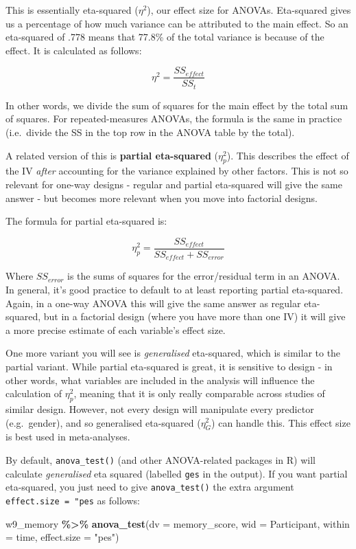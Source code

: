 \documentclass[
]{book}
\newenvironment{Shaded}{\begin{snugshade}}{\end{snugshade}}
\newcommand{\AttributeTok}[1]{\textcolor[rgb]{0.13,0.29,0.53}{#1}}
\newcommand{\FunctionTok}[1]{\textcolor[rgb]{0.13,0.29,0.53}{\textbf{#1}}}
\newcommand{\NormalTok}[1]{#1}
\newcommand{\SpecialCharTok}[1]{\textcolor[rgb]{0.81,0.36,0.00}{\textbf{#1}}}
\newcommand{\StringTok}[1]{\textcolor[rgb]{0.31,0.60,0.02}{#1}}
\begin{document}
This is essentially eta-squared (\(\eta^2\)), our effect size for ANOVAs. Eta-squared gives us a percentage of how much variance can be attributed to the main effect. So an eta-squared of .778 means that 77.8\% of the total variance is because of the effect. It is calculated as follows:

\[
\eta^2 = \frac{SS_{effect}}{SS_t}
\]

In other words, we divide the sum of squares for the main effect by the total sum of squares. For repeated-measures ANOVAs, the formula is the same in practice (i.e.~divide the SS in the top row in the ANOVA table by the total).

A related version of this is \textbf{partial eta-squared} (\(\eta^2_p\)). This describes the effect of the IV \emph{after} accounting for the variance explained by other factors. This is not so relevant for one-way designs - regular and partial eta-squared will give the same answer - but becomes more relevant when you move into factorial designs.

The formula for partial eta-squared is:

\[
\eta^2_p = \frac{SS_{effect}}{SS_{effect} + SS_{error}}
\]

Where \(SS_{error}\) is the sums of squares for the error/residual term in an ANOVA. In general, it's good practice to default to at least reporting partial eta-squared. Again, in a one-way ANOVA this will give the same answer as regular eta-squared, but in a factorial design (where
you have more than one IV) it will give a more precise estimate of each variable's effect size.

One more variant you will see is \emph{generalised} eta-squared, which is similar to the partial variant. While partial eta-squared is great, it is sensitive to design - in other words, what variables are included in the analysis will influence the calculation of \(\eta^2_p\), meaning that it is only really comparable across studies of similar design. However, not every design will manipulate every predictor (e.g.~gender), and so generalised eta-squared (\(\eta^2_G\)) can handle this. This effect size is best used in meta-analyses.

By default, \texttt{anova\_test()} (and other ANOVA-related packages in R) will calculate \emph{generalised} eta squared (labelled \texttt{ges} in the output). If you want partial eta-squared, you just need to give \texttt{anova\_test()} the extra argument \texttt{effect.size\ =\ "pes} as follows:

\begin{Shaded}
\begin{Highlighting}[]
\NormalTok{w9\_memory }\SpecialCharTok{\%\textgreater{}\%}
  \FunctionTok{anova\_test}\NormalTok{(}\AttributeTok{dv =}\NormalTok{ memory\_score, }\AttributeTok{wid =}\NormalTok{ Participant, }\AttributeTok{within =}\NormalTok{ time, }\AttributeTok{effect.size =} \StringTok{"pes"}\NormalTok{) }
\end{Highlighting}
\end{Shaded}
\end{document}
